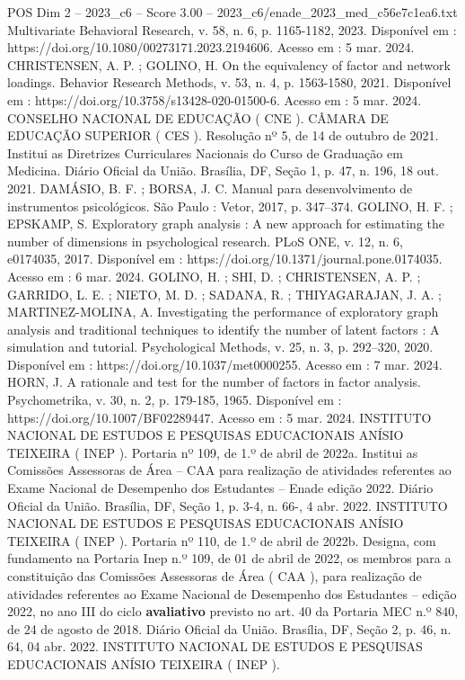 \begin{textsample}{POS Dim 2 – 2023\_c6 – Score 3.00 – 2023\_c6/enade\_2023\_med\_c56e7c1ea6.txt}
Multivariate Behavioral Research, v. 58, n. 6, p. 1165-1182, 2023.
Disponível em : https://doi.org/10.1080/00273171.2023.2194606.
Acesso em : 5 mar. 2024.
CHRISTENSEN, A.
P. ; GOLINO, H.
On the equivalency of factor and network loadings.
Behavior Research Methods, v. 53, n. 4, p. 1563-1580, 2021.
Disponível em : https://doi.org/10.3758/s13428-020-01500-6.
Acesso em : 5 mar. 2024.
CONSELHO NACIONAL DE EDUCAÇÃO ( CNE ).
CÂMARA DE EDUCAÇÃO SUPERIOR ( CES ).
Resolução nº 5, de 14 de outubro de 2021.
Institui as Diretrizes Curriculares Nacionais do Curso de Graduação em Medicina.
Diário Oficial da União.
Brasília, DF, Seção 1, p. 47, n. 196, 18 out. 2021.
DAMÁSIO, B.
F. ; BORSA, J.
C.
Manual para desenvolvimento de instrumentos psicológicos.
São Paulo : Vetor, 2017, p. 347–374.
GOLINO, H.
F. ; EPSKAMP, S.
Exploratory graph analysis : A new approach for estimating the number of dimensions in psychological research.
PLoS ONE, v. 12, n. 6, e0174035, 2017.
Disponível em : https://doi.org/10.1371/journal.pone.0174035.
Acesso em : 6 mar. 2024.
GOLINO, H. ; SHI, D. ; CHRISTENSEN, A.
P. ; GARRIDO, L.
E. ; NIETO, M.
D. ; SADANA, R. ; THIYAGARAJAN, J.
A. ; MARTINEZ-MOLINA, A.
Investigating the performance of exploratory graph analysis and traditional techniques to identify the number of latent factors : A simulation and tutorial.
Psychological Methods, v. 25, n. 3, p. 292–320, 2020.
Disponível em : https://doi.org/10.1037/met0000255.
Acesso em : 7 mar. 2024.
HORN, J.
A rationale and test for the number of factors in factor analysis.
Psychometrika, v. 30, n. 2, p. 179-185, 1965.
Disponível em : https://doi.org/10.1007/BF02289447.
Acesso em : 5 mar. 2024.
INSTITUTO NACIONAL DE ESTUDOS E PESQUISAS EDUCACIONAIS ANÍSIO TEIXEIRA ( INEP ).
Portaria nº 109, de 1.º de abril de 2022a.
Institui as Comissões Assessoras de Área – CAA para realização de atividades referentes ao Exame Nacional de Desempenho dos Estudantes – Enade edição 2022.
Diário Oficial da União.
Brasília, DF, Seção 1, p. 3-4, n. 66-, 4 abr. 2022.
INSTITUTO NACIONAL DE ESTUDOS E PESQUISAS EDUCACIONAIS ANÍSIO TEIXEIRA ( INEP ).
Portaria nº 110, de 1.º de abril de 2022b.
Designa, com fundamento na Portaria Inep n.º 109, de 01 de abril de 2022, os membros para a constituição das Comissões Assessoras de Área ( CAA ), para realização de atividades referentes ao Exame Nacional de Desempenho dos Estudantes – edição 2022, no ano III do ciclo \textbf{avaliativo} previsto no art. 40 da Portaria MEC n.º 840, de 24 de agosto de 2018.
Diário Oficial da União.
Brasília, DF, Seção 2, p. 46, n. 64, 04 abr. 2022.
INSTITUTO NACIONAL DE ESTUDOS E PESQUISAS EDUCACIONAIS ANÍSIO TEIXEIRA ( INEP ).

\end{textsample}
